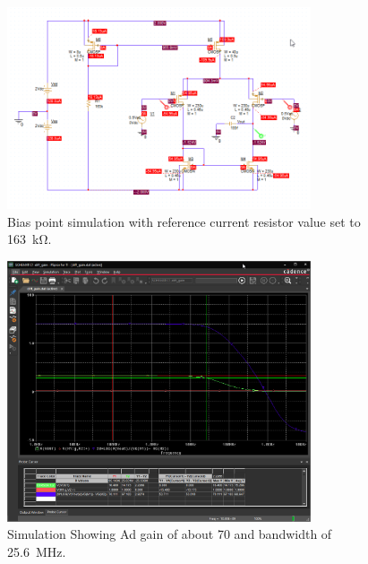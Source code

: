 \documentclass{article}
\newcommand \imgWidthFactor{0.8}
\begin{document}
		\begin{figure}[H]
			\centering
			\includegraphics[width=\imgWidthFactor\textwidth]{sch}
			\caption{Bias point simulation with reference current resistor value set to \SI{163}{\kohm}.}
		\end{figure}

		\begin{figure}[H]
			\centering
			\includegraphics[width=\imgWidthFactor\textwidth]{ad}
			\caption{Simulation Showing Ad gain of about \SI{70}{} and bandwidth of \SI{25.6}{\MHz}.}
		\end{figure}
\end{document}
